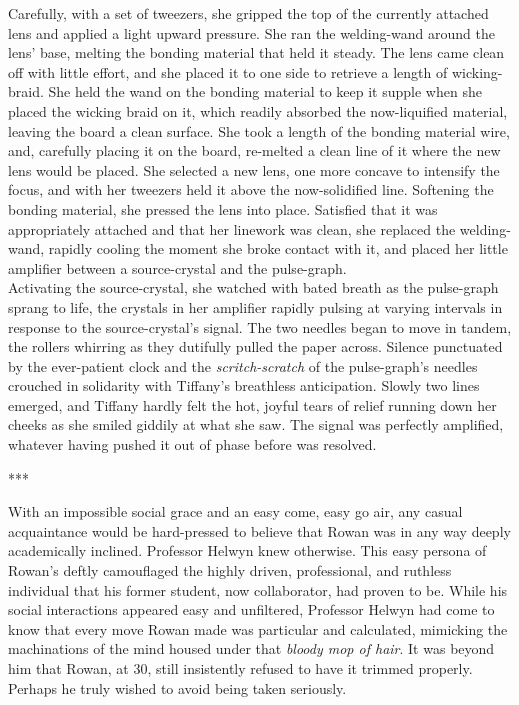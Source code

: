 Carefully, with a set of tweezers, she gripped the top of the currently attached lens and applied a light upward pressure.
She ran the welding-wand around the lens' base, melting the bonding material that held it steady.
The lens came clean off with little effort, and she placed it to one side to retrieve a length of wicking-braid.
She held the wand on the bonding material to keep it supple when she placed the wicking braid on it, which readily absorbed the now-liquified material, leaving the board a clean surface.
She took a length of the bonding material wire, and, carefully placing it on the board, re-melted a clean line of it where the new lens would be placed.
She selected a new lens, one more concave to intensify the focus, and with her tweezers held it above the now-solidified line.
Softening the bonding material, she pressed the lens into place.
Satisfied that it was appropriately attached and that her linework was clean, she replaced the welding-wand, rapidly cooling the moment she broke contact with it, and placed her little amplifier between a source-crystal and the pulse-graph.\\

Activating the source-crystal, she watched with bated breath as the pulse-graph sprang to life, the crystals in her amplifier rapidly pulsing at varying intervals in response to the source-crystal's signal.
The two needles began to move in tandem, the rollers whirring as they dutifully pulled the paper across.
Silence punctuated by the ever-patient clock and the \textit{scritch-scratch} of the pulse-graph's needles crouched in solidarity with Tiffany's breathless anticipation.
Slowly two lines emerged, and Tiffany hardly felt the hot, joyful tears of relief running down her cheeks as she smiled giddily at what she saw.
The signal was perfectly amplified, whatever having pushed it out of phase before was resolved.\\


\begin{center}
***
\end{center}

With an impossible social grace and an easy come, easy go air, any casual acquaintance would be hard-pressed to believe that Rowan was in any way deeply academically inclined.
Professor Helwyn knew otherwise. 
This easy persona of Rowan's deftly camouflaged the highly driven, professional, and ruthless individual that his former student, now collaborator, had proven to be.
While his social interactions appeared easy and unfiltered, Professor Helwyn had come to know that every move Rowan made was particular and calculated, mimicking the machinations of the mind housed under that \textit{bloody mop of hair}.
It was beyond him that Rowan, at 30, still insistently refused to have it trimmed properly.
Perhaps he truly wished to avoid being taken seriously.\\

